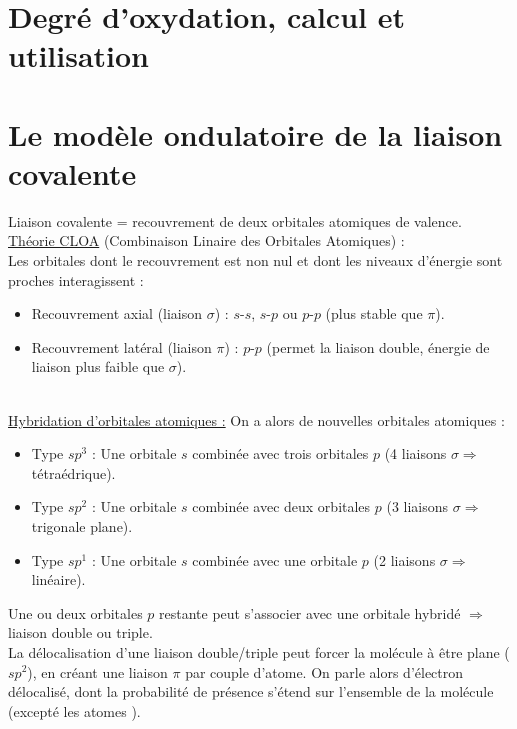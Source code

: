 \documentclass[13pt, twoside, a4paper, french, tikz]{report}
\begin{document}
  
  \section{Degré d'oxydation, calcul et utilisation}\label{sec:degre-d'oxydation-calcul-et-utilisation}
  
  
  \section{Le modèle ondulatoire de la liaison covalente}\label{sec:le-modele-ondulatoire-de-la-liaison-covalente}
  
    Liaison covalente = recouvrement de deux orbitales atomiques de valence.\\
    
    \underline{Théorie CLOA} (Combinaison Linaire des Orbitales Atomiques) :\\
    
    Les orbitales dont le recouvrement est non nul et dont les niveaux d'énergie sont proches interagissent :
    \begin{itemize}
      \item Recouvrement axial (liaison $\sigma$) : $s$-$s$, $s$-$p$ ou $p$-$p$ (plus stable que $\pi$).
      \item Recouvrement latéral (liaison $\pi$) : $p$-$p$ (permet la liaison double, énergie de liaison plus faible que $\sigma$).
    \end{itemize}
    \ \\
    \underline{Hybridation d'orbitales atomiques :} On a alors de nouvelles orbitales atomiques :
    \begin{itemize}
      \item Type $sp^3$ : Une orbitale $s$ combinée avec trois orbitales $p$ (4 liaisons $\sigma \Rightarrow$ tétraédrique).
      \item Type $sp^2$ : Une orbitale $s$ combinée avec deux orbitales $p$ (3 liaisons $\sigma \Rightarrow$ trigonale plane).
      \item Type $sp^1$ : Une orbitale $s$ combinée avec une orbitale $p$ (2 liaisons $\sigma \Rightarrow$ linéaire).
    \end{itemize}
    Une ou deux orbitales $p$ restante peut s'associer avec une orbitale hybridé $\Rightarrow$ liaison double ou triple.\\
    
    La délocalisation d'une liaison double/triple peut forcer la molécule à être plane ($sp^2$), en créant une liaison $\pi$ par couple d'atome.
    On parle alors d'électron délocalisé, dont la probabilité de présence s'étend sur l'ensemble de la molécule (excepté les atomes ).
    
    
\end{document}
